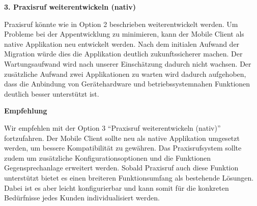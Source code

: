\textbf{3. Praxisruf weiterentwickeln (nativ)}

Praxisruf könnte wie in Option 2 beschrieben weiterentwickelt werden.
Um Probleme bei der Appentwicklung zu minimieren, kann der Mobile Client als native Applikation neu entwickelt werden.
Nach dem initialen Aufwand der Migration würde dies die Applikation deutlich zukunftssicherer machen.
Der Wartungsaufwand wird nach unserer Einschätzung dadurch nicht wachsen.
Der zusätzliche Aufwand zwei Applikationen zu warten wird dadurch aufgehoben, dass die Anbindung von Gerätehardware
und betriebssystemnahen Funktionen deutlich besser unterstützt ist.

\textbf{Empfehlung}

Wir empfehlen mit der Option 3 ``Praxisruf weiterentwickeln (nativ)'' fortzufahren.
Der Mobile Client sollte neu als native Applikation umgesetzt werden, um bessere Kompatibilität zu gewähren.
Das Praxisrufsystem sollte zudem um zusätzliche Konfigurationsoptionen und die Funktionen Gegensprechanlage erweitert werden.
Sobald Praxisruf auch diese Funktion unterstützt bietet es einen breiteren Funktionsumfang als bestehende Lösungen.
Dabei ist es aber leicht konfigurierbar und kann somit für die konkreten Bedürfnisse jedes Kunden individualisiert werden.

\clearpage
